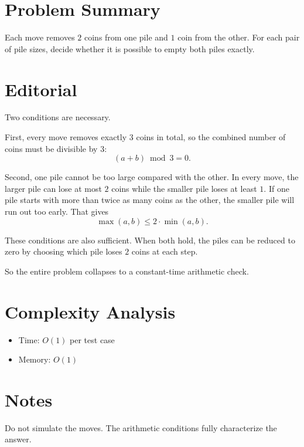 \section{Problem Summary}
Each move removes \(2\) coins from one pile and \(1\) coin from the other. For each pair of pile sizes, decide whether it is possible to empty both piles exactly.

\section{Editorial}
Two conditions are necessary.

First, every move removes exactly \(3\) coins in total, so the combined number of coins must be divisible by \(3\):
\[
(a + b) \bmod 3 = 0.
\]

Second, one pile cannot be too large compared with the other. In every move, the larger pile can lose at most \(2\) coins while the smaller pile loses at least \(1\). If one pile starts with more than twice as many coins as the other, the smaller pile will run out too early. That gives
\[
\max(a, b) \le 2 \cdot \min(a, b).
\]

These conditions are also sufficient. When both hold, the piles can be reduced to zero by choosing which pile loses \(2\) coins at each step.

So the entire problem collapses to a constant-time arithmetic check.

\section{Complexity Analysis}
\begin{itemize}
\item Time: \(O(1)\) per test case
\item Memory: \(O(1)\)
\end{itemize}

\section{Notes}
Do not simulate the moves. The arithmetic conditions fully characterize the answer.
